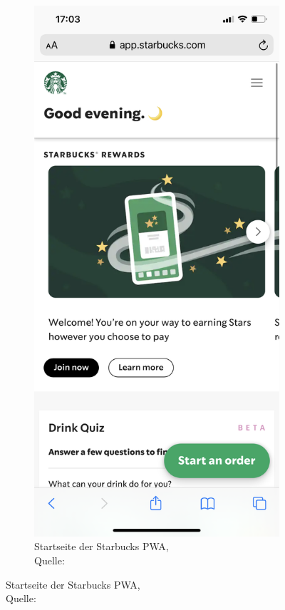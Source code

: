 \begin{figure}[h]
	\begin{subfigure}[b]{0.4\textwidth}
		\includegraphics[scale=0.15]{images/starbucks_main.PNG}
		\caption[Startseite der Starbucks \ac{PWA}]{Startseite der Starbucks \ac{PWA},\\ Quelle: \cite{starbucksPwaMain}}

\end{subfigure}
\end{figure}
